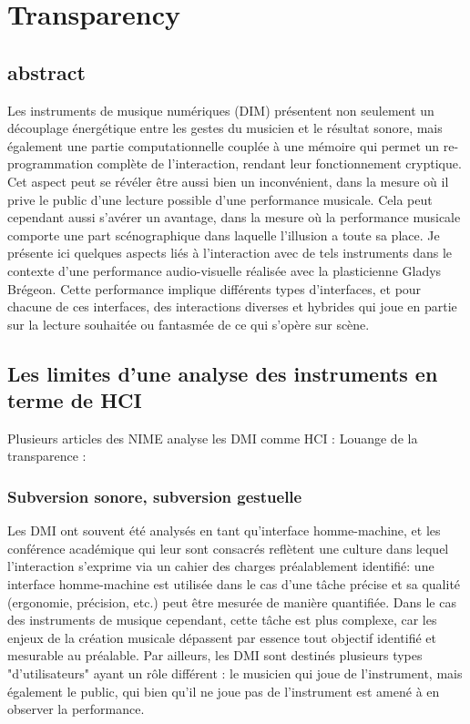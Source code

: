 %
\chapter{Transparency}
\label{ch:transparency}


\section{abstract}
\label{sec:transparency:abstract}

Les instruments de musique numériques (DIM) présentent non seulement un découplage énergétique entre les gestes du musicien et le résultat sonore, mais également une partie computationnelle couplée à une mémoire qui permet un re-programmation complète de l'interaction, rendant leur fonctionnement cryptique. Cet aspect peut se révéler être aussi bien un inconvénient, dans la mesure où il prive le public d’une lecture possible d’une performance musicale. Cela peut cependant aussi s’avérer un avantage, dans la mesure où la performance musicale comporte une part scénographique dans laquelle l’illusion a toute sa place.
Je présente ici quelques aspects liés à l’interaction avec de tels instruments dans le contexte d’une performance audio-visuelle réalisée avec la plasticienne Gladys Brégeon. Cette performance implique différents types d’interfaces, et pour chacune de ces interfaces, des interactions diverses et hybrides qui joue en partie sur la lecture souhaitée ou fantasmée de ce qui s’opère sur scène.

\section{Les limites d'une analyse des instruments en terme de HCI}
\label{sec:transparency:limitesHCI}

Plusieurs articles des NIME analyse les DMI comme HCI : 
Louange de la transparence : \cite{Fels02}

\subsection{Subversion sonore, subversion gestuelle}


Les DMI ont souvent été analysés en tant qu'interface homme-machine, et les conférence académique qui leur sont consacrés reflètent une culture dans lequel l'interaction s'exprime via un cahier des charges préalablement identifié: une interface homme-machine est utilisée dans le cas d'une tâche précise et sa qualité (ergonomie, précision, etc.) peut être mesurée de manière quantifiée.
Dans le cas des instruments de musique cependant, cette tâche est plus complexe, car les enjeux de la création musicale dépassent par essence tout objectif identifié et mesurable au préalable. Par ailleurs, les DMI sont destinés plusieurs types "d'utilisateurs" ayant un rôle différent : le musicien qui joue de l'instrument, mais également le public, qui bien qu'il ne joue pas de l'instrument est amené à en observer la performance.

